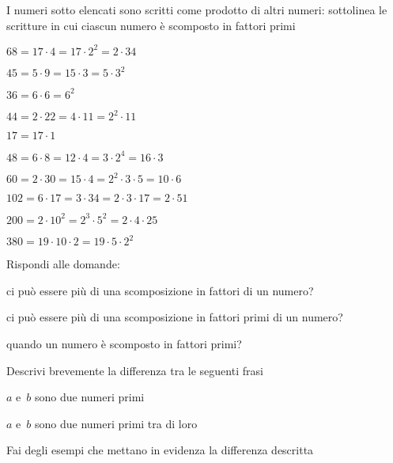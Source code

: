 \begin{esercizio}
I numeri sotto elencati sono scritti come prodotto di altri numeri: 
sottolinea 
le scritture in cui ciascun
numero è scomposto in fattori primi
\begin{htmulticols}{2}
 \begin{enumeratees}
 \item \(68=17\cdot4=17\cdot2^2=2\cdot34\)
 \item \(45=5\cdot9=15\cdot3=5\cdot3^2\)
 \item \(36=6\cdot6=6^2\)
 \item \(44=2\cdot22=4\cdot11=2^2\cdot11\)
 \item \(17=17\cdot1\)
 \item \(48=6\cdot8=12\cdot4=3\cdot2^4=16\cdot3\)
 \item \(60= 2\cdot30=15\cdot4=2^2\cdot3\cdot5=10\cdot6\)
 \item \(102=6\cdot17=3\cdot34=2\cdot3\cdot17=2\cdot51\)
 \item \(200=2\cdot10^2=2^3\cdot5^2=2\cdot4\cdot25\)
 \item \(380=19\cdot10\cdot2=19\cdot5\cdot2^2\)
 \end{enumeratees}
\end{htmulticols}
\end{esercizio}

\begin{esercizio}
 Rispondi alle domande:
 \begin{enumeratees}
 \item ci può essere più di una scomposizione in fattori di un numero?
 \item ci può essere più di una scomposizione in fattori primi di un numero?
 \item quando un numero è scomposto in fattori primi?
 \end{enumeratees}
\end{esercizio}

\begin{esercizio}
Descrivi brevemente la differenza tra le seguenti frasi
\begin{enumeratees}
 \item \(a\) e~\(b\) sono due numeri primi
 \item \(a\) e~\(b\) sono due numeri primi tra di loro
\end{enumeratees}
Fai degli esempi che mettano in evidenza la differenza descritta
\end{esercizio}

